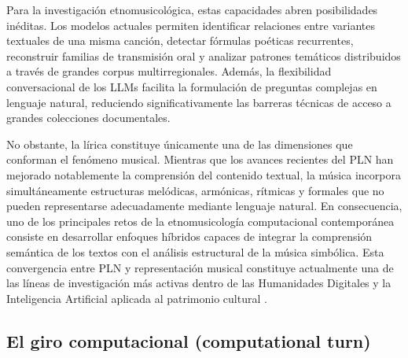 Para la investigación etnomusicológica, estas capacidades abren posibilidades inéditas. Los modelos actuales permiten identificar relaciones entre variantes textuales de una misma canción, detectar fórmulas poéticas recurrentes, reconstruir familias de transmisión oral y analizar patrones temáticos distribuidos a través de grandes corpus multirregionales. Además, la flexibilidad conversacional de los LLMs facilita la formulación de preguntas complejas en lenguaje natural, reduciendo significativamente las barreras técnicas de acceso a grandes colecciones documentales.

No obstante, la lírica constituye únicamente una de las dimensiones que conforman el fenómeno musical. Mientras que los avances recientes del PLN han mejorado notablemente la comprensión del contenido textual, la música incorpora simultáneamente estructuras melódicas, armónicas, rítmicas y formales que no pueden representarse adecuadamente mediante lenguaje natural. En consecuencia, uno de los principales retos de la etnomusicología computacional contemporánea consiste en desarrollar enfoques híbridos capaces de integrar la comprensión semántica de los textos con el análisis estructural de la música simbólica. Esta convergencia entre PLN y representación musical constituye actualmente una de las líneas de investigación más activas dentro de las Humanidades Digitales y la Inteligencia Artificial aplicada al patrimonio cultural \citep{zhao2023comprehensive, ji2023comprehensive}.

\subsection{El giro computacional (computational turn)}

